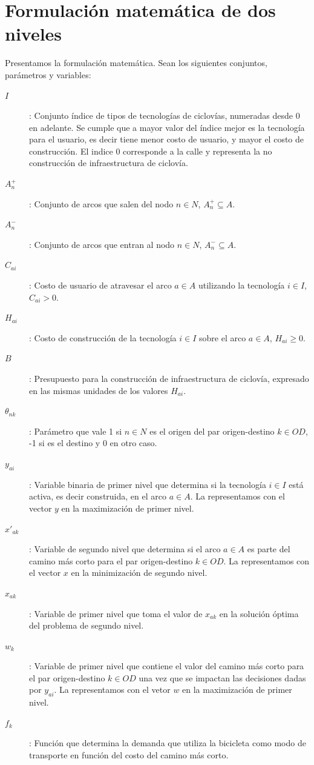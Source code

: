 \FloatBarrier
\clearpage
\section{Formulación matemática de dos niveles}

Presentamos la formulación matemática. Sean los siguientes conjuntos, parámetros y variables:

\begin{description}
  \item[$I$]: Conjunto índice de tipos de tecnologías de ciclovías, numeradas desde $0$ en adelante. Se cumple que a mayor valor del índice mejor es la tecnología para el usuario, es decir tiene menor costo de usuario, y mayor el costo de construcción. El indice 0 corresponde a la calle y representa la no construcción de infraestructura de ciclovía.
  \item[$A_n^+$]: Conjunto de arcos que salen del nodo $n \in N$, $A_n^+ \subseteq A$.
  \item[$A_n^-$]: Conjunto de arcos que entran al nodo $n \in N$, $A_n^- \subseteq A$.
  \item[$C_{ai}$]: Costo de usuario de atravesar el arco $a \in A$ utilizando la tecnología $i \in I$, $C_{ai} > 0$.
  \item[$H_{ai}$]: Costo de construcción de la tecnología $i \in I$ sobre el arco $a \in A$, $H_{ai} \geq 0$.
  \item[$B$]: Presupuesto para la construcción de infraestructura de ciclovía, expresado en las mismas unidades de los valores $H_{ai}$.
  \item[$\theta_{nk}$]: Parámetro que vale 1 si $n \in N$ es el origen del par origen-destino $k \in OD$, -1 si es el destino y 0 en otro caso.
  \item[$y_{ai}$]: Variable binaria de primer nivel que determina si la tecnología $i \in I$ está activa, es decir construida, en el arco $a \in A$. La representamos con el vector $y$ en la maximización de primer nivel.
  \item[$x'_{ak}$]: Variable de segundo nivel que determina si el arco $a \in A$ es parte del camino más corto para el par origen-destino $k \in OD$. La representamos con el vector $x$ en la minimización de segundo nivel.
  \item[$x_{ak}$]: Variable de primer nivel que toma el valor de $x_{ak}$ en la solución óptima del problema de segundo nivel.
  \item[$w_k$]: Variable de primer nivel que contiene el valor del camino más corto para el par origen-destino $k \in OD$ una vez que se impactan las decisiones dadas por $y_{ai}$. La representamos con el vetor $w$ en la maximización de primer nivel.
  \item[$f_k$]: Función que determina la demanda que utiliza la bicicleta como modo de transporte en función del costo del camino más corto.
\end{description}

